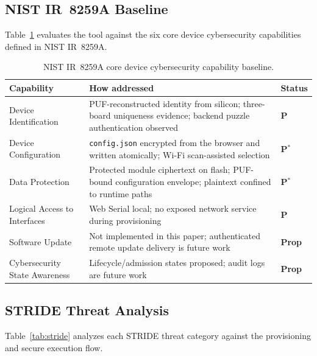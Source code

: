 \documentclass[runningheads]{llncs}
\begin{document}
\subsection{NIST IR~8259A Baseline}

Table~\ref{tab:nist} evaluates the tool against the six core device cybersecurity capabilities defined in NIST IR~8259A.

\begin{table}[ht]
\caption{NIST IR~8259A core device cybersecurity capability baseline.}
\label{tab:nist}
\centering
\setlength{\tabcolsep}{3pt}
\begin{tabularx}{\linewidth}{lXl}
\toprule
Capability & How addressed & Status \\
\midrule
Device Identification
  & PUF-reconstructed identity from silicon; three-board uniqueness evidence; backend puzzle authentication observed
  & \textbf{P} \\
Device Configuration
  & \texttt{config.json} encrypted from the browser and written atomically; Wi-Fi scan-assisted selection
  & \textbf{P}$^*$ \\
Data Protection
  & Protected module ciphertext on flash; PUF-bound configuration envelope; plaintext confined to runtime paths
  & \textbf{P}$^*$ \\
Logical Access to Interfaces
  & Web Serial local; no exposed network service during provisioning
  & \textbf{P} \\
Software Update
  & Not implemented in this paper; authenticated remote update delivery is future work
  & \textbf{Prop} \\
Cybersecurity State Awareness
  & Lifecycle/admission states proposed; audit logs are future work
  & \textbf{Prop} \\
\bottomrule
\end{tabularx}
\end{table}

\subsection{STRIDE Threat Analysis}

Table~\ref{tab:stride} analyzes each STRIDE threat category against the provisioning and secure execution flow.
\end{document}
